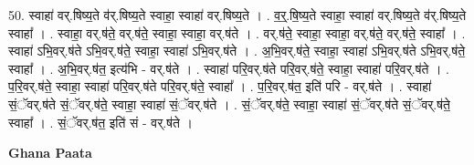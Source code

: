 \documentclass[17pt]{extarticle}
\begin{document}
50. स्वाहा॑ वर्.षिष्य॒ते व॑र्.षिष्य॒ते स्वाहा॒ स्वाहा॑ वर्.षिष्य॒ते । . व॒र्॒.षि॒ष्य॒ते स्वाहा॒ स्वाहा॑ वर्.षिष्य॒ते व॑र्.षिष्य॒ते स्वाहा᳚ । . स्वाहा॒ वर्.ष॑ते॒ वर्.ष॑ते॒ स्वाहा॒ स्वाहा॒ वर्.ष॑ते । . वर्.ष॑ते॒ स्वाहा॒ स्वाहा॒ वर्.ष॑ते॒ वर्.ष॑ते॒ स्वाहा᳚ । . स्वाहा॑ ऽभि॒वर्.ष॑ते ऽभि॒वर्.ष॑ते॒ स्वाहा॒ स्वाहा॑ ऽभि॒वर्.ष॑ते । . अ॒भि॒वर्.ष॑ते॒ स्वाहा॒ स्वाहा॑ ऽभि॒वर्.ष॑ते ऽभि॒वर्.ष॑ते॒ स्वाहा᳚ । . अ॒भि॒वर्.ष॑त॒ इत्य॑भि - वर्.ष॑ते । . स्वाहा॑ परि॒वर्.ष॑ते परि॒वर्.ष॑ते॒ स्वाहा॒ स्वाहा॑ परि॒वर्.ष॑ते । . प॒रि॒वर्.ष॑ते॒ स्वाहा॒ स्वाहा॑ परि॒वर्.ष॑ते परि॒वर्.ष॑ते॒ स्वाहा᳚ । . प॒रि॒वर्.ष॑त॒ इति॑ परि - वर्.ष॑ते । . स्वाहा॑ सं॒ॅवर्.ष॑ते सं॒ॅवर्.ष॑ते॒ स्वाहा॒ स्वाहा॑ सं॒ॅवर्.ष॑ते । . सं॒ॅवर्.ष॑ते॒ स्वाहा॒ स्वाहा॑ सं॒ॅवर्.ष॑ते सं॒ॅवर्.ष॑ते॒ स्वाहा᳚ । . सं॒ॅवर्.ष॑त॒ इति॑ सं - वर्.ष॑ते । \newline

\textbf{Ghana Paata } \newline
\end{document}
